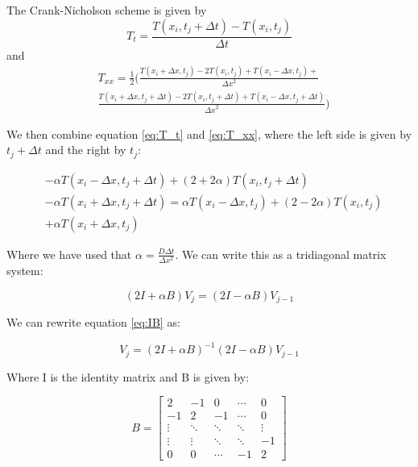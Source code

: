 \documentclass{article}
\begin{document}
\begin{multicols}{2}
The Crank-Nicholson scheme is given by
\begin{equation}
T_t = \frac{T(x_i,t_j+\Delta t)-T(x_i,t_j)}{\Delta t}
\label{eq:T_t}
\end{equation}
and 
\begin{equation}
\begin{split}
&T_{xx}=\frac{1}{2}\bigg( \frac{T(x_i+\Delta x, t_j)-2T(x_i,t_j)+T(x_i-\Delta x, t_j)+}{{\Delta x}^2} \\
&\frac{T(x_i + \Delta x, t_j + \Delta t )-2T(x_i,t_j+\Delta t)+T(x_i -\Delta x, t_j + \Delta t)}{{\Delta x}^2}\bigg)
\label{eq:T_xx}
\end{split}
\end{equation}

We then combine equation \ref{eq:T_t} and \ref{eq:T_xx}, where the left side is given by $t_j+\Delta t$ and the right by $t_j$:

\begin{equation}
\begin{split}
&-\alpha T(x_i-\Delta x, t_j+\Delta t)+(2+2\alpha) T(x_i, t_j+\Delta t)\\
&-\alpha T(x_i+\Delta x,t_j+\Delta t)=\alpha T(x_i-\Delta x, t_j)+(2-2\alpha)T(x_i,t_j)\\
&+\alpha T(x_i+\Delta x, t_j)
\end{split}
\end{equation}

Where we have used that $\alpha = \frac{D\Delta t}{\Delta x^2}$. We can write this as a tridiagonal matrix system:

\begin{equation}
(2I+\alpha B)V_j=(2I-\alpha B)V_{j-1}
\label{eq:IB}
\end{equation}

We can rewrite equation \ref{eq:IB} as:

\begin{equation}
V_j = (2I+\alpha B)^{-1}(2I-\alpha B)V_{j-1}
\end{equation}

Where I is the identity matrix and B is given by:

\begin{equation*}
B = 
\begin{bmatrix}
2 & -1 & 0 & \cdots & 0 \\
-1 & 2 & -1 & \cdots & 0  \\
\vdots  & \ddots  & \ddots & \ddots & \vdots  \\
\vdots  & \vdots  & \ddots & \ddots & -1  \\
0 & 0 & \cdots & -1 & 2
\end{bmatrix}
\end{equation*}


\end{multicols}
\end{document}
